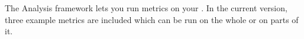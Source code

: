 The Analysis framework  lets you run metrics on your \gdproject{}. In the current version, three example metrics are included which can be run on the whole \gdproject{} or on parts of it.
